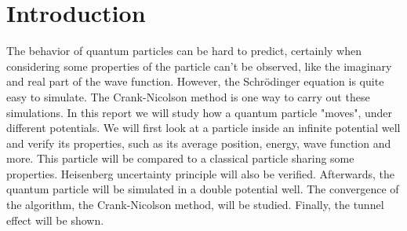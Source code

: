 \section{Introduction}

The behavior of quantum particles can be hard to predict, certainly when considering some properties of the particle can't be observed, like the imaginary and real part of the wave function. However, the Schrödinger equation is quite easy to simulate. The Crank-Nicolson method is one way to carry out these simulations. In this report we will study how a quantum particle "moves", under different potentials. We will first look at a particle inside an infinite potential well and verify its properties, such as its average position, energy, wave function and more. This particle will be compared to a classical particle sharing some properties. Heisenberg uncertainty principle will also be verified. Afterwards, the quantum particle will be simulated in a double potential well. The convergence of the algorithm, the Crank-Nicolson method, will be studied. Finally, the tunnel effect will be shown.
